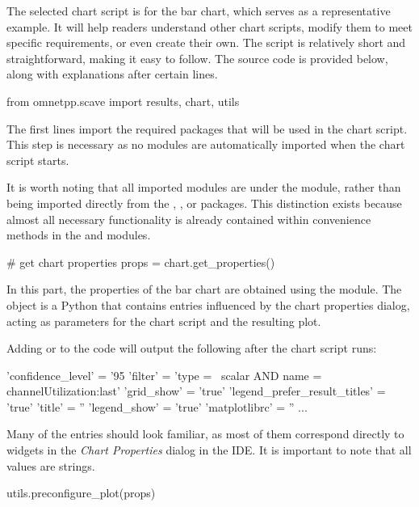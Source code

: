 The selected chart script is for the bar chart, which serves as a representative
example. It will help readers understand other chart scripts, modify them to
meet specific requirements, or even create their own. The script is relatively
short and straightforward, making it easy to follow. The source code is provided
below, along with explanations after certain lines.

\begin{python}
from omnetpp.scave import results, chart, utils
\end{python}

The first lines import the required packages that will be used in the chart
script. This step is necessary as no modules are automatically imported when the
chart script starts.

It is worth noting that all imported modules are under the 
module, rather than being imported directly from the , ,
or  packages. This distinction exists because almost all
necessary functionality is already contained within convenience methods in the
 and  modules.

\begin{python}
# get chart properties
props = chart.get_properties()
\end{python}

In this part, the properties of the bar chart are obtained using the 
module. The  object is a Python  that contains entries
influenced by the chart properties dialog, acting as parameters for the chart
script and the resulting plot.

Adding  or  to the code will output the following after the chart script runs:

\begin{commandline}
'confidence_level' = '95%
'filter' = 'type =~ scalar AND name =~ channelUtilization:last'
'grid_show' = 'true'
'legend_prefer_result_titles' = 'true'
'title' = ''
'legend_show' = 'true'
'matplotlibrc' = ''
...
\end{commandline}

Many of the entries should look familiar, as most of them correspond directly to
widgets in the \textit{Chart Properties} dialog in the IDE. It is important to
note that all values are strings.

\begin{python}
utils.preconfigure_plot(props)
\end{python}


